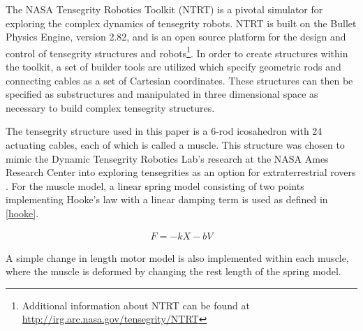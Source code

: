\documentclass{llncs}
\begin{document}
The NASA Tensegrity Robotics Toolkit (NTRT) is a pivotal simulator for exploring the complex dynamics of tensegrity robots. 
NTRT is built on the Bullet Physics Engine, version 2.82, and is an open source platform for the design and control of tensegrity structures and robots\footnote{Additional information about NTRT can be found at \\ \url{http://irg.arc.nasa.gov/tensegrity/NTRT}}.
In order to create structures within the toolkit, a set of builder tools are utilized which specify geometric rods and connecting cables as a set of Cartesian coordinates.
These structures can then be specified as substructures and manipulated in three dimensional space as necessary to build complex tensegrity structures.


The tensegrity structure used in this paper is a 6-rod icosahedron with 24 actuating cables, each of which is called a muscle. 
This structure was chosen to mimic the Dynamic Tensegrity Robotics Lab's research at the NASA Ames Research Center into exploring tensegrities as an option for extraterrestrial rovers \cite{NIACfinalreport, bruce2014design, sabelhaus2014hardware}.
For the muscle model, a linear spring model consisting of two points implementing Hooke's law with a linear damping term is used as defined in \eqref{hooke}.

\begin{align}
F = -kX - bV \label{hooke}
\end{align}

A simple change in length motor model is also implemented within each muscle, where the muscle is deformed by changing the rest length of the spring model.

%
\end{document}
